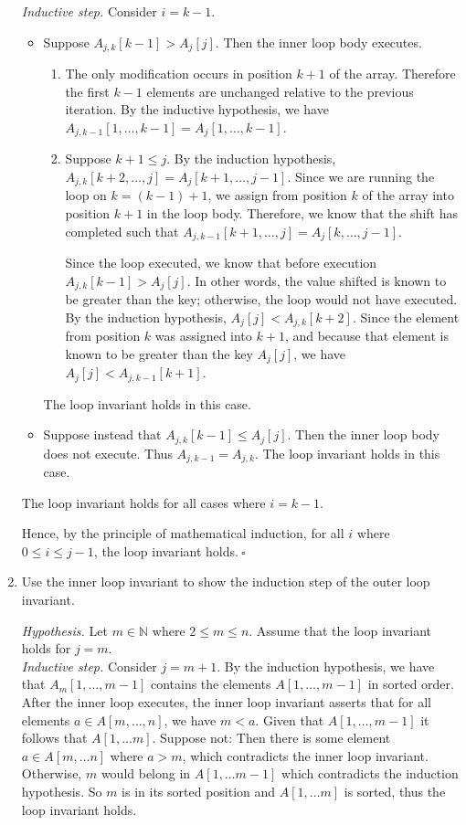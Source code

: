 \begin{enumerate}
\begin{solution}
\textit{Inductive step. }Consider $i=k-1$.
\begin{itemize}
\item Suppose $A_{j,k}[k-1]>A_j[j]$. Then the inner loop body executes.
\begin{enumerate}
    \item The only modification occurs in position $k+1$ of the array. Therefore the first $k-1$ elements are unchanged relative to the previous iteration. By the inductive hypothesis, we have $A_{j,k-1}[1,\dots,k-1]=A_j[1,\dots,k-1]$.
    \item Suppose $k+1\leq j$. By the induction hypothesis, $A_{j,k}[k+2,\dots,j]=A_j[k+1,\dots,j-1]$. Since we are running the loop on $k=(k-1)+1$, we assign from position $k$ of the array into position $k+1$ in the loop body. Therefore, we know that the shift has completed such that $A_{j,k-1}[k+1,\dots,j]=A_j[k,\dots,j-1]$.

    Since the loop executed, we know that before execution $A_{j,k}[k-1]>A_j[j]$. In other words, the value shifted is known to be greater than the key; otherwise, the loop would not have executed. By the induction hypothesis, $A_j[j]<A_{j,k}[k+2]$. Since the element from position $k$ was assigned into $k+1$, and because that element is known to be greater than the key $A_j[j]$, we have $A_j[j]<A_{j,k-1}[k+1]$.
    
\end{enumerate}
The loop invariant holds in this case.
\item Suppose instead that $A_{j,k}[k-1]\leq A_j[j]$. Then the inner loop body does not execute. Thus $A_{j,k-1}=A_{j,k}$. The loop invariant holds in this case.
\end{itemize}
The loop invariant holds for all cases where $i=k-1$.

Hence, by the principle of mathematical induction, for all $i$ where $0\leq i\leq j-1$, the loop invariant holds.$~\square$
\end{solution}
	
\item Use the inner loop invariant to show the induction step of the outer loop invariant.
	
\begin{solution}
\textit{Hypothesis.} Let $m\in\mathbb{N}$ where $2\leq m\leq n$. Assume that the loop invariant holds for $j=m$.\\

\textit{Inductive step. }Consider $j=m+1$. By the induction hypothesis, we have that $A_m[1,\dots,m-1]$ contains the elements $A[1,\dots,m-1]$ in sorted order. After the inner loop executes, the inner loop invariant asserts that for all elements $a\in A[m,\dots,n]$, we have $m<a$. Given that $A[1,\dots,m-1]$ it follows that $A[1,\dots m]$. Suppose not: Then there is some element $a\in A[m,\dots n]$ where $a>m$, which contradicts the inner loop invariant. Otherwise, $m$ would belong in $A[1,\dots m-1]$ which contradicts the induction hypothesis. So $m$ is in its sorted position and $A[1,\dots m]$ is sorted, thus the loop invariant holds.


\end{solution}
\end{enumerate}
